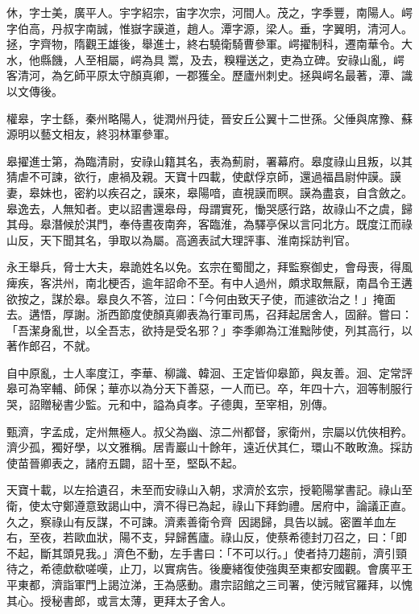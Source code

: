 \begin{pinyinscope}
 休，字士美，廣平人。宇字紹宗，宙字次宗，河間人。茂之，字季豐，南陽人。崿字伯高，丹叔字南誠，惟嶽字謨道，趙人。潭字源，梁人。垂，字翼明，清河人。拯，字齊物，隋觀王雄後，舉進士，終右驍衛騎曹參軍。崿擢制科，遷南華令。大水，他縣饑，人至相屬，崿為具𩜾鬻，及去，糗糧送之，吏為立碑。安祿山亂，崿客清河，為乞師平原太守顏真卿，一郡獲全。歷廬州刺史。拯與崿名最著，潭、識以文傳後。



 權皋，字士繇，秦州略陽人，徙潤州丹徒，晉安丘公翼十二世孫。父倕與席豫、蘇源明以藝文相友，終羽林軍參軍。



 皋擢進士第，為臨清尉，安祿山籍其名，表為薊尉，署幕府。皋度祿山且叛，以其猜虐不可諫，欲行，慮禍及親。天寶十四載，使獻俘京師，還過福昌尉仲謨。謨妻，皋妹也，密約以疾召之，謨來，皋陽喑，直視謨而瞑。謨為盡哀，自含斂之。皋逸去，人無知者。吏以詔書還皋母，母謂實死，慟哭感行路，故祿山不之虞，歸其母。皋潛候於淇門，奉侍晝夜南奔，客臨淮，為驛亭保以言冋北方。既度江而祿山反，天下聞其名，爭取以為屬。高適表試大理評事、淮南採訪判官。



 永王舉兵，脅士大夫，皋詭姓名以免。玄宗在蜀聞之，拜監察御史，會母喪，得風痺疾，客洪州，南北梗否，逾年詔命不至。有中人過州，頗求取無厭，南昌令王遘欲按之，謀於皋。皋良久不答，泣曰：「今何由致天子使，而遽欲治之！」掩面去。遘悟，厚謝。浙西節度使顏真卿表為行軍司馬，召拜起居舍人，固辭。嘗曰：「吾潔身亂世，以全吾志，欲持是受名邪？」李季卿為江淮黜陟使，列其高行，以著作郎召，不就。



 自中原亂，士人率度江，李華、柳識、韓洄、王定皆仰皋節，與友善。洄、定常評皋可為宰輔、師保；華亦以為分天下善惡，一人而已。卒，年四十六，洄等制服行哭，詔贈秘書少監。元和中，謚為貞孝。子德輿，至宰相，別傳。



 甄濟，字孟成，定州無極人。叔父為幽、涼二州都督，家衛州，宗屬以伉俠相矜。濟少孤，獨好學，以文雅稱。居青巖山十餘年，遠近伏其仁，環山不敢畋漁。採訪使苗晉卿表之，諸府五闢，詔十至，堅臥不起。



 天寶十載，以左拾遺召，未至而安祿山入朝，求濟於玄宗，授範陽掌書記。祿山至衛，使太守鄭遵意致謁山中，濟不得已為起，祿山下拜鈞禮。居府中，論議正直。久之，察祿山有反謀，不可諫。濟素善衛令齊，因謁歸，具告以誠。密置羊血左右，至夜，若歐血狀，陽不支，舁歸舊廬。祿山反，使蔡希德封刀召之，曰：「即不起，斷其頭見我。」濟色不動，左手書曰：「不可以行。」使者持刀趨前，濟引頸待之，希德歔欷嗟嘆，止刀，以實病告。後慶緒復使強輿至東都安國觀。會廣平王平東都，濟詣軍門上謁泣涕，王為感動。肅宗詔館之三司署，使污賊官羅拜，以愧其心。授秘書郎，或言太薄，更拜太子舍人。




\end{pinyinscope}
